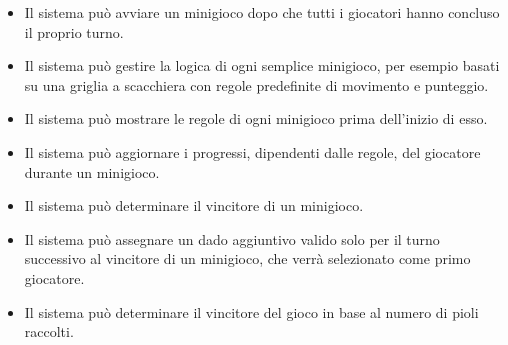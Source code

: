 \begin{itemize}
      \item Il sistema può avviare un minigioco dopo che tutti i giocatori hanno concluso
            il proprio turno.
      \item Il sistema può gestire la logica di ogni semplice minigioco, per esempio 
            basati su una griglia a scacchiera con regole predefinite di movimento e punteggio.
      \item Il sistema può mostrare le regole di ogni minigioco prima dell'inizio di esso.
      \item Il sistema può aggiornare i progressi, dipendenti dalle regole, del giocatore 
            durante un minigioco.
      \item Il sistema può determinare il vincitore di un minigioco.
      \item Il sistema può assegnare un dado aggiuntivo valido solo per il turno successivo al
            vincitore di un minigioco, che verrà selezionato come primo giocatore.
      \item Il sistema può determinare il vincitore del gioco in base al numero di pioli raccolti.
\end{itemize}